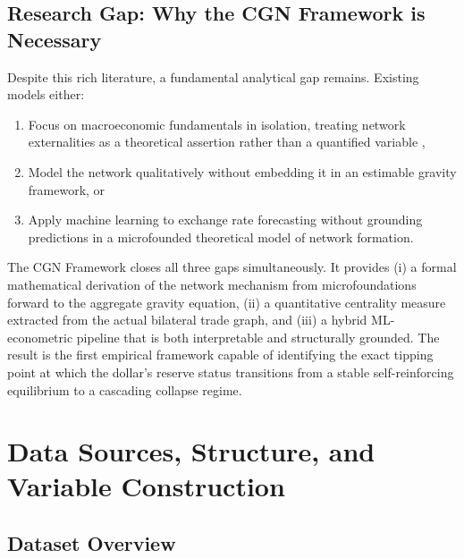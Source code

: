 \documentclass[12pt, letterpaper]{article}
\theoremstyle{definition}
\begin{document}
\subsection{Research Gap: Why the CGN Framework is Necessary}

Despite this rich literature, a fundamental analytical gap remains. Existing models either:
\begin{enumerate}[label=(\roman*)]
    \item Focus on macroeconomic fundamentals in isolation, treating network externalities as a theoretical assertion rather than a quantified variable \citep{chinn2005euro, frankel2012internationalization},
    \item Model the network qualitatively without embedding it in an estimable gravity framework, or
    \item Apply machine learning to exchange rate forecasting without grounding predictions in a microfounded theoretical model of network formation.
\end{enumerate}

The CGN Framework closes all three gaps simultaneously. It provides (i) a formal mathematical derivation of the network mechanism from microfoundations forward to the aggregate gravity equation, (ii) a quantitative centrality measure extracted from the actual bilateral trade graph, and (iii) a hybrid ML-econometric pipeline that is both interpretable and structurally grounded. The result is the first empirical framework capable of identifying the exact tipping point at which the dollar's reserve status transitions from a stable self-reinforcing equilibrium to a cascading collapse regime.

\newpage
\section{Data Sources, Structure, and Variable Construction}
\label{sec:data}

\subsection{Dataset Overview}
\end{document}
